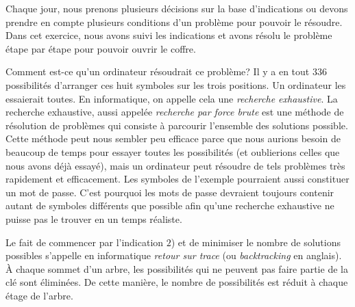 \documentclass[a4paper,11pt]{report}
\begin{document}
Chaque jour, nous prenons plusieurs décisions sur la base d’indications ou devons prendre en compte plusieurs conditions d’un problème pour pouvoir le résoudre. Dans cet exercice, nous avons suivi les indications et avons résolu le problème étape par étape pour pouvoir ouvrir le coffre.

Comment est-ce qu’un ordinateur résoudrait ce problème? Il y a en tout $336$ possibilités d’arranger ces huit symboles sur les trois positions. Un ordinateur les essaierait toutes. En informatique, on appelle cela une \emph{recherche exhaustive}. La recherche exhaustive, aussi appelée \emph{recherche par force brute}  est une méthode de résolution de problèmes qui consiste à parcourir l’ensemble des solutions possible. Cette méthode peut nous sembler peu efficace parce que nous aurions besoin de beaucoup de temps pour essayer toutes les possibilités (et oublierions celles que nous avons déjà essayé), mais un ordinateur peut résoudre de tels problèmes très rapidement et efficacement. Les symboles de l’exemple pourraient aussi constituer un mot de passe. C’est pourquoi les mots de passe devraient toujours contenir autant de symboles différents que possible afin qu’une recherche exhaustive ne puisse pas le trouver en un temps réaliste.

Le fait de commencer par l’indication $2$) et de minimiser le nombre de solutions possibles s’appelle en informatique \emph{retour sur trace} (ou \emph{backtracking} en anglais). À chaque sommet d’un arbre, les possibilités qui ne peuvent pas faire partie de la clé sont éliminées. De cette manière, le nombre de possibilités est réduit à chaque étage de l’arbre.
\end{document}
